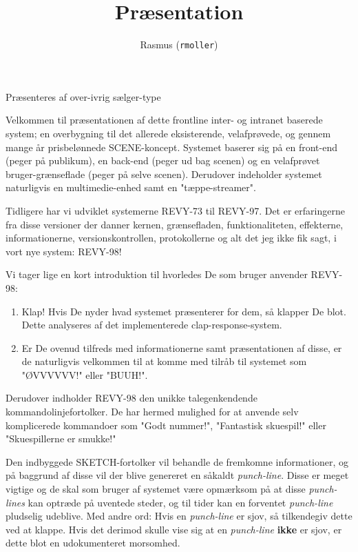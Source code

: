 \documentclass[danish]{article}
\title{Præsentation}
\author{Rasmus (\texttt{rmoller})}
\begin{document}
\maketitle

\begin{sketch}

\scene Præsenteres af over-ivrig sælger-type

 Velkommen til præsentationen af dette frontline inter- og intranet
baserede system; en overbygning til det allerede eksisterende, velafprøvede, og
gennem mange år prisbelønnede SCENE-koncept. Systemet baserer sig på en
front-end (peger på publikum), en back-end (peger ud bag scenen) og en
velafprøvet bruger-grænseflade (peger på selve scenen). Derudover indeholder
systemet naturligvis en multimedie-enhed samt en "tæppe-streamer".

Tidligere har vi udviklet systemerne REVY-73 til REVY-97. Det er erfaringerne 
fra disse versioner der danner kernen, grænsefladen, funktionaliteten, 
effekterne, informationerne, versionskontrollen, protokollerne og alt det 
jeg ikke fik sagt, i vort nye system: REVY-98!

Vi tager lige en kort introduktion til hvorledes De som bruger anvender REVY-98:
\begin{enumerate}
\item Klap! Hvis De nyder hvad systemet præsenterer for dem, så klapper De blot. 
Dette analyseres af det implementerede clap-response-system.
\item Er De ovenud tilfreds med informationerne samt præsentationen af disse, er de
naturligvis velkommen til at komme med tilråb til systemet som "ØVVVVVV!" eller "BUUH!".
\end{enumerate}

Derudover indholder REVY-98 den unikke talegenkendende kommandolinjefortolker. De
har hermed mulighed for at anvende selv komplicerede kommandoer som "Godt nummer!", 
"Fantastisk skuespil!" eller "Skuespillerne er smukke!" 

Den indbyggede SKETCH-fortolker vil behandle de fremkomne informationer, 
og på baggrund af disse vil der blive genereret en såkaldt 
\textit{punch-line}. Disse er meget vigtige og de skal som bruger af systemet 
være opmærksom på at disse \textit{punch-lines} kan optræde på uventede steder, 
og til tider kan en forventet \textit{punch-line} pludselig udeblive. Med andre 
ord: Hvis en \textit{punch-line} er sjov, så tilkendegiv dette ved at klappe. 
Hvis det derimod skulle vise sig at en \textit{punch-line} \textbf{ikke} er sjov, 
er dette blot en udokumenteret morsomhed.


\end{sketch}
\end{document}

